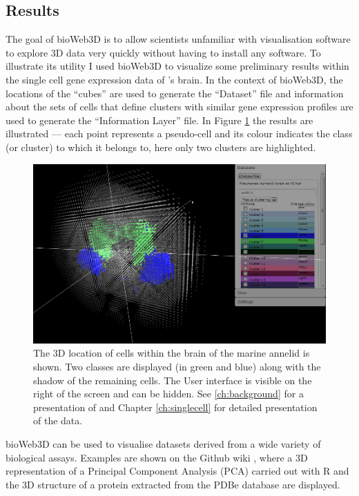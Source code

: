 	\subsection{Results}

	The goal of bioWeb3D is to allow scientists unfamiliar with visualisation software to explore 3D data very quickly without having to install any software.
	To illustrate its utility I used bioWeb3D to visualize some preliminary results within the single cell gene expression data of \platy{}'s brain. In the context of bioWeb3D, the locations of the ``cubes'' are used to generate the ``Dataset'' file and information about the sets of cells that define clusters with similar gene expression profiles are used to generate the ``Information Layer'' file. In Figure \ref{fig:bioweb3d} the results are illustrated ---  each point represents a pseudo-cell and its colour indicates the class (or cluster) to which it belongs to, here only two clusters are highlighted. 
	
	\begin{figure}[h]
\centerline{\includegraphics[width=\linewidth]{gfx/chapter3/bioweb3d.png}}
\caption{The 3D location of cells within the brain of the marine annelid \platyfull{} is shown. Two classes are displayed (in green and blue) along with the shadow of the remaining cells. The User interface is visible on the right of the screen and can be hidden. See \ref{ch:background} for a presentation of \platy{} and Chapter \ref{ch:singlecell} for detailed presentation of the data.}\label{fig:bioweb3d}
	\end{figure}

	bioWeb3D can be used to visualise datasets derived from a wide variety of biological assays. Examples are shown on the Github wiki \cite{github}, where a 3D representation of a Principal Component Analysis (PCA) carried out with R and the 3D structure of a protein extracted from the PDBe database are displayed.\\
	
